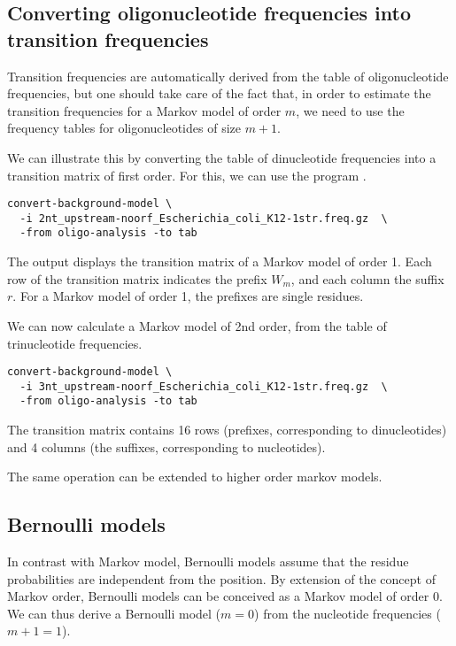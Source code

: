 \subsection{Converting oligonucleotide frequencies into transition frequencies}

Transition frequencies are automatically derived from the table of
oligonucleotide frequencies, but one should take care of the fact
that, in order to estimate the transition frequencies for a Markov
model of order $m$, we need to use the frequency tables for
oligonucleotides of size $m+1$.

We can illustrate this by converting the table of dinucleotide
frequencies into a transition matrix of first order. For this, we can
use the program .

\begin{small}
\begin{verbatim}
convert-background-model \
  -i 2nt_upstream-noorf_Escherichia_coli_K12-1str.freq.gz  \
  -from oligo-analysis -to tab
\end{verbatim}
\end{small}

The output displays the transition matrix of a Markov model of order
1.  Each row of the transition matrix indicates the prefix $W_m$, and
each column the suffix $r$. For a Markov model of order 1, the
prefixes are single residues.

We can now calculate a Markov model of 2nd order, from the table of
trinucleotide frequencies.

\begin{small}
\begin{verbatim}
convert-background-model \
  -i 3nt_upstream-noorf_Escherichia_coli_K12-1str.freq.gz  \
  -from oligo-analysis -to tab
\end{verbatim}
\end{small}

The transition matrix contains 16 rows (prefixes, corresponding to
dinucleotides) and 4 columns (the suffixes, corresponding to
nucleotides).

The same operation can be extended to higher order markov models.

\subsection{Bernoulli models}

In contrast with Markov model, Bernoulli models assume that the
residue probabilities are independent from the position. By extension
of the concept of Markov order, Bernoulli models can be conceived as a
Markov model of order 0. We can thus derive a Bernoulli model ($m=0$)
from the nucleotide frequencies ($m+1=1$).

